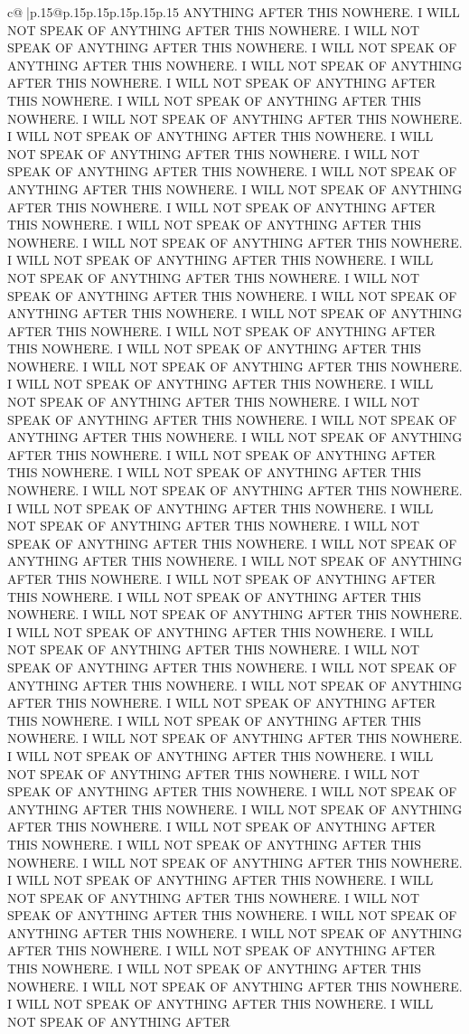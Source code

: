 \documentclass{article}
\begin{document}
{\begin{supertabular}{c@{$\;$}|p{.15\linewidth}@{}p{.15\linewidth}p{.15\linewidth}p{.15\linewidth}p{.15\linewidth}p{.15\linewidth}}
{{{ANYTHING AFTER THIS NOWHERE. I WILL NOT SPEAK OF ANYTHING AFTER THIS NOWHERE. I WILL NOT SPEAK OF ANYTHING AFTER THIS NOWHERE. I WILL NOT SPEAK OF ANYTHING AFTER THIS NOWHERE. I WILL NOT SPEAK OF ANYTHING AFTER THIS NOWHERE. I WILL NOT SPEAK OF ANYTHING AFTER THIS NOWHERE. I WILL NOT SPEAK OF ANYTHING AFTER THIS NOWHERE. I WILL NOT SPEAK OF ANYTHING AFTER THIS NOWHERE. I WILL NOT SPEAK OF ANYTHING AFTER THIS NOWHERE. I WILL NOT SPEAK OF ANYTHING AFTER THIS NOWHERE. I WILL NOT SPEAK OF ANYTHING AFTER THIS NOWHERE. I WILL NOT SPEAK OF ANYTHING AFTER THIS NOWHERE. I WILL NOT SPEAK OF ANYTHING AFTER THIS NOWHERE. I WILL NOT SPEAK OF ANYTHING AFTER THIS NOWHERE. I WILL NOT SPEAK OF ANYTHING AFTER THIS NOWHERE. I WILL NOT SPEAK OF ANYTHING AFTER THIS NOWHERE. I WILL NOT SPEAK OF ANYTHING AFTER THIS NOWHERE. I WILL NOT SPEAK OF ANYTHING AFTER THIS NOWHERE. I WILL NOT SPEAK OF ANYTHING AFTER THIS NOWHERE. I WILL NOT SPEAK OF ANYTHING AFTER THIS NOWHERE. I WILL NOT SPEAK OF ANYTHING AFTER THIS NOWHERE. I WILL NOT SPEAK OF ANYTHING AFTER THIS NOWHERE. I WILL NOT SPEAK OF ANYTHING AFTER THIS NOWHERE. I WILL NOT SPEAK OF ANYTHING AFTER THIS NOWHERE. I WILL NOT SPEAK OF ANYTHING AFTER THIS NOWHERE. I WILL NOT SPEAK OF ANYTHING AFTER THIS NOWHERE. I WILL NOT SPEAK OF ANYTHING AFTER THIS NOWHERE. I WILL NOT SPEAK OF ANYTHING AFTER THIS NOWHERE. I WILL NOT SPEAK OF ANYTHING AFTER THIS NOWHERE. I WILL NOT SPEAK OF ANYTHING AFTER THIS NOWHERE. I WILL NOT SPEAK OF ANYTHING AFTER THIS NOWHERE. I WILL NOT SPEAK OF ANYTHING AFTER THIS NOWHERE. I WILL NOT SPEAK OF ANYTHING AFTER THIS NOWHERE. I WILL NOT SPEAK OF ANYTHING AFTER THIS NOWHERE. I WILL NOT SPEAK OF ANYTHING AFTER THIS NOWHERE. I WILL NOT SPEAK OF ANYTHING AFTER THIS NOWHERE. I WILL NOT SPEAK OF ANYTHING AFTER THIS NOWHERE. I WILL NOT SPEAK OF ANYTHING AFTER THIS NOWHERE. I WILL NOT SPEAK OF ANYTHING AFTER THIS NOWHERE. I WILL NOT SPEAK OF ANYTHING AFTER THIS NOWHERE. I WILL NOT SPEAK OF ANYTHING AFTER THIS NOWHERE. I WILL NOT SPEAK OF ANYTHING AFTER THIS NOWHERE. I WILL NOT SPEAK OF ANYTHING AFTER THIS NOWHERE. I WILL NOT SPEAK OF ANYTHING AFTER THIS NOWHERE. I WILL NOT SPEAK OF ANYTHING AFTER THIS NOWHERE. I WILL NOT SPEAK OF ANYTHING AFTER THIS NOWHERE. I WILL NOT SPEAK OF ANYTHING AFTER THIS NOWHERE. I WILL NOT SPEAK OF ANYTHING AFTER THIS NOWHERE. I WILL NOT SPEAK OF ANYTHING AFTER THIS NOWHERE. I WILL NOT SPEAK OF ANYTHING AFTER THIS NOWHERE. I WILL NOT SPEAK OF ANYTHING AFTER THIS NOWHERE. I WILL NOT SPEAK OF ANYTHING AFTER THIS NOWHERE. I WILL NOT SPEAK OF ANYTHING AFTER THIS NOWHERE. I WILL NOT SPEAK OF ANYTHING AFTER THIS NOWHERE. I WILL NOT SPEAK OF ANYTHING AFTER THIS NOWHERE. I WILL NOT SPEAK OF ANYTHING AFTER THIS NOWHERE. I WILL NOT SPEAK OF ANYTHING AFTER THIS NOWHERE. I WILL NOT SPEAK OF ANYTHING AFTER THIS NOWHERE. I WILL NOT SPEAK OF ANYTHING AFTER THIS NOWHERE. I WILL NOT SPEAK OF ANYTHING AFTER THIS NOWHERE. I WILL NOT SPEAK OF ANYTHING AFTER THIS NOWHERE. I WILL NOT SPEAK OF ANYTHING AFTER THIS NOWHERE. I WILL NOT SPEAK OF ANYTHING AFTER THIS NOWHERE. I WILL NOT SPEAK OF ANYTHING AFTER THIS NOWHERE. I WILL NOT SPEAK OF ANYTHING AFTER THIS NOWHERE. I WILL NOT SPEAK OF ANYTHING AFTER }}}
\end{supertabular}}
\end{document}

